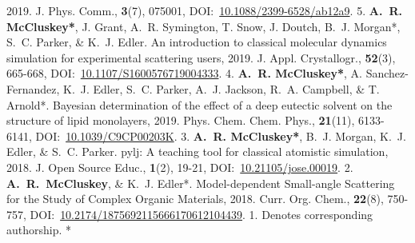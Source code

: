 \begin{cvpubys}
    {2019.}
    {J. Phys. Comm.,}
    {\textbf{3}(7), 075001,}
    {DOI:~\href{https://doi.org/10.1088/2399-6528/ab12a9}{10.1088/2399-6528/ab12a9}.}
    {5.}
  \cvpuby
    {\textbf{A.~R. McCluskey*}, J. Grant, A.~R. Symington, T. Snow, J. Doutch, B.~J. Morgan*, S.~C. Parker, \& K.~J. Edler.}
    {An introduction to classical molecular dynamics simulation for experimental scattering users,}
    {2019.}
    {J. Appl. Crystallogr.,}
    {\textbf{52}(3), 665-668,}
    {DOI:~\href{https://doi.org/10.1107/S1600576719004333}{10.1107/S1600576719004333}.}
    {4.}
  \cvpuby
    {\textbf{A.~R. McCluskey*}, A. Sanchez-Fernandez, K.~J. Edler, S.~C. Parker, A.~J. Jackson, R.~A. Campbell, \& T. Arnold*.}
    {Bayesian determination of the effect of a deep eutectic solvent on the structure of lipid monolayers,}
    {2019.}
    {Phys. Chem. Chem. Phys.,}
    {\textbf{21}(11), 6133-6141,}
    {DOI:~\href{https://doi.org/10.1039/C9CP00203K}{10.1039/C9CP00203K}.}
    {3.}
  \cvpuby
    {\textbf{A.~R. McCluskey*}, B.~J. Morgan, K.~J. Edler, \& S.~C. Parker.}
    {pylj: A teaching tool for classical atomistic simulation,}
    {2018.}
    {J. Open Source Educ.,}
    {\textbf{1}(2), 19-21,}
    {DOI:~\href{http://doi.org/10.21105/jose.00019}{10.21105/jose.00019}.}
    {2.}
  \cvpuby
    {\textbf{A.~R.~McCluskey}, \& K.~J. Edler*.}
    {Model-dependent Small-angle Scattering for the Study of Complex Organic Materials,}
    {2018.}
    {Curr. Org. Chem.,}
    {\textbf{22}(8), 750-757,}
    {DOI:~\href{http://doi.org/10.2174/1875692115666170612104439}{10.2174/1875692115666170612104439}.}
    {1.}
  \cvpuby
    {Denotes corresponding authorship.}
    {}
    {}
    {}
    {}
    {}
    {*}
\end{cvpubys}
